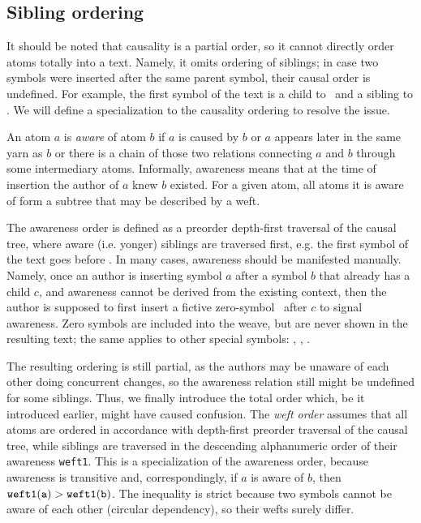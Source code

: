 \documentclass{acm_proc_article-sp}
\begin{document}
\subsection {Sibling ordering}

It should be noted that causality is a partial order, so it
cannot directly order atoms totally into a text. Namely, it
omits ordering of siblings; in case two symbols were inserted
after the same parent symbol, their causal order is undefined.
For example, the first symbol of the text is a child to \aum
~and a sibling to \eoa. We will define a specialization to
the causality ordering to resolve the issue.

An atom $a$ is \emph{aware} of atom $b$ if $a$ is caused
by $b$ or $a$ appears later in the same yarn as $b$ or
there is a chain of those two relations connecting $a$ and
$b$ through some intermediary atoms.
Informally, awareness means that at the time of insertion
the author of $a$ knew $b$ existed. For a given atom, all
atoms it is aware of form a subtree that may be described
by a weft.

The awareness order is 
defined as a preorder depth-first traversal of the causal
tree, where aware (i.e. yonger) siblings are traversed first,
e.g. the first symbol of the text goes
before \eoa. In many cases, awareness should be manifested
manually. Namely, once an author is inserting symbol $a$ after
a symbol $b$ that already has a child $c$, and awareness
cannot be derived from the existing context, then the author is
supposed to first insert a fictive zero-symbol \zero ~after $c$
to signal awareness.
Zero symbols are included into the
weave, but are never shown in the resulting text; the same
applies to other special symbols: \aum, \eoa, \bsp.

The resulting ordering is still partial, as the authors
may be unaware of each other doing concurrent changes, so
the awareness relation still might be undefined for some
siblings. Thus, we finally introduce the total order
which, be it introduced earlier, might have caused confusion.
The \emph{weft order} assumes that all atoms are ordered in
accordance with depth-first preorder traversal of the causal
tree, while siblings are traversed in the descending 
alphanumeric order of their awareness {\tt weft1}.
This is a specialization of the awareness order, because
awareness is transitive and, correspondingly, if $a$ is
aware of $b$, then $\tt weft1(a) > weft1(b)$. The inequality is
strict because two symbols cannot be aware of each other
(circular dependency), so their wefts surely differ.
\end{document}
